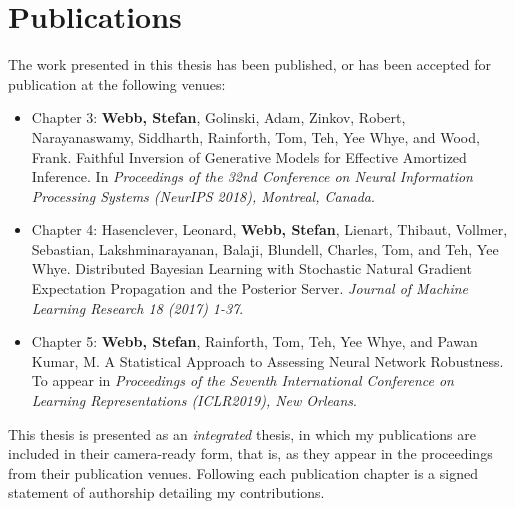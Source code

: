 \section{Publications}
The work presented in this thesis has been published, or has been accepted for publication at the following venues:
\begin{itemize}
	\item Chapter 3: {\bfseries Webb, Stefan}, Golinski, Adam, Zinkov, Robert, Narayanaswamy, Siddharth, Rainforth, Tom, Teh, Yee Whye, and Wood, Frank. Faithful Inversion of Generative Models for Effective Amortized Inference. In {\itshape Proceedings of the 32nd Conference on Neural Information Processing Systems (NeurIPS 2018), Montreal, Canada}.
	\item Chapter 4: Hasenclever, Leonard, {\bfseries Webb, Stefan}, Lienart, Thibaut, Vollmer, Sebastian, Lakshminarayanan, Balaji, Blundell, Charles, Tom, and Teh, Yee Whye. Distributed Bayesian Learning with Stochastic Natural Gradient Expectation Propagation and the Posterior Server. {\itshape Journal of Machine Learning Research 18 (2017) 1-37}.
	\item Chapter 5: {\bfseries Webb, Stefan}, Rainforth, Tom, Teh, Yee Whye, and Pawan Kumar, M. A Statistical Approach to Assessing Neural Network Robustness. To appear in {\itshape Proceedings of the Seventh International Conference on Learning Representations (ICLR2019), New Orleans}.
\end{itemize}
This thesis is presented as an \emph{integrated} thesis, in which my publications are included in their camera-ready form, that is, as they appear in the proceedings from their publication venues. Following each publication chapter is a signed statement of authorship detailing my contributions.




